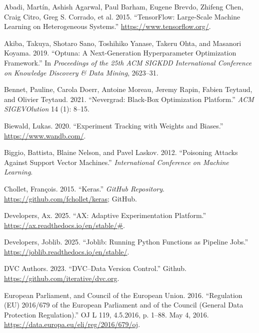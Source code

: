 \documentclass[
]{article}
\newlength{\cslhangindent}
\newlength{\cslentryspacingunit} %
\newenvironment{CSLReferences}[2] %
 {%
  \setlength{\parindent}{0pt}
  \ifodd #1
  \let\oldpar\par
  \def\par{\hangindent=\cslhangindent\oldpar}
  \fi
  \setlength{\parskip}{#2\cslentryspacingunit}
 }%
 {}
\begin{document}
\hypertarget{refs}{}
\begin{CSLReferences}{1}{0}
\leavevmode{}%
Abadi, Martín, Ashish Agarwal, Paul Barham, Eugene Brevdo, Zhifeng Chen,
Craig Citro, Greg S. Corrado, et al. 2015. {``{TensorFlow}: Large-Scale
Machine Learning on Heterogeneous Systems.''}
\url{https://www.tensorflow.org/}.

\leavevmode{}%
Akiba, Takuya, Shotaro Sano, Toshihiko Yanase, Takeru Ohta, and Masanori
Koyama. 2019. {``Optuna: A Next-Generation Hyperparameter Optimization
Framework.''} In \emph{Proceedings of the 25th ACM SIGKDD International
Conference on Knowledge Discovery \& Data Mining}, 2623--31.

\leavevmode{}%
Bennet, Pauline, Carola Doerr, Antoine Moreau, Jeremy Rapin, Fabien
Teytaud, and Olivier Teytaud. 2021. {``Nevergrad: Black-Box Optimization
Platform.''} \emph{ACM SIGEVOlution} 14 (1): 8--15.

\leavevmode{}%
Biewald, Lukas. 2020. {``Experiment Tracking with Weights and Biases.''}
\url{https://www.wandb.com/}.

\leavevmode{}%
Biggio, Battista, Blaine Nelson, and Pavel Laskov. 2012. {``Poisoning
Attacks Against Support Vector Machines.''} \emph{International
Conference on Machine Learning}.

\leavevmode{}%
Chollet, François. 2015. {``Keras.''} \emph{GitHub Repository}.
\url{https://github.com/fchollet/keras}; GitHub.

\leavevmode{}%
Developers, Ax. 2025. {``AX: Adaptive Experimentation Platform.''}
\url{https://ax.readthedocs.io/en/stable/\#}.

\leavevmode{}%
Developers, Joblib. 2025. {``Joblib: Running Python Functions as
Pipeline Jobs.''} \url{https://joblib.readthedocs.io/en/stable/}.

\leavevmode{}%
DVC Authors. 2023. {``{DVC}--{Data Version Control}.''} Github.
\url{https://github.com/iterative/dvc.org}.

\leavevmode{}%
European Parliament, and Council of the European Union. 2016.
{``Regulation ({EU}) 2016/679 of the {European} {Parliament} and of the
{Council} ({General} {Data}
{Protection} {Regulation}).''} OJ L 119, 4.5.2016, p. 1--88. May 4,
2016. \url{https://data.europa.eu/eli/reg/2016/679/oj}.


\end{CSLReferences}
\end{document}
